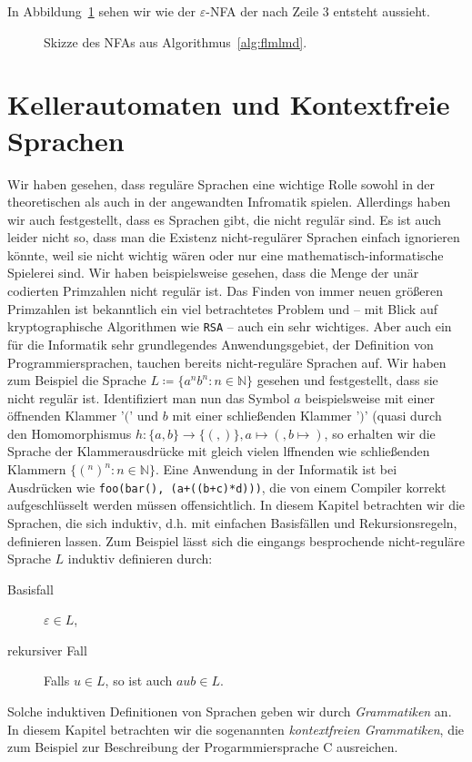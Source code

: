 \documentclass[11pt, a4paper]{article}
\theoremstyle{definition}
\theoremstyle{plain}
\numberwithin{equation}{section}
\begin{document}
In Abbildung~\ref{fig:flmlmd} sehen wir wie der $\varepsilon$-NFA der nach Zeile 3 entsteht aussieht.
\begin{figure}
	\centering
	
	\caption{Skizze des NFAs aus Algorithmus~\ref{alg:flmlmd}.}
	\label{fig:flmlmd}
\end{figure}



\newpage
\section{Kellerautomaten und Kontextfreie Sprachen}\label{sec:contextfree}
Wir haben gesehen, dass reguläre Sprachen eine wichtige Rolle sowohl in der theoretischen als auch in der angewandten Infromatik spielen. Allerdings haben wir auch festgestellt, dass es Sprachen gibt, die nicht regulär sind. Es ist auch leider nicht so, dass man die Existenz nicht-regulärer Sprachen einfach ignorieren könnte, weil sie nicht wichtig wären oder nur eine mathematisch-informatische Spielerei sind. Wir haben beispielsweise gesehen, dass die Menge der unär codierten Primzahlen nicht regulär ist. Das Finden von immer neuen größeren Primzahlen ist bekanntlich ein viel betrachtetes Problem und -- mit Blick auf kryptographische Algorithmen wie \texttt{RSA} -- auch ein sehr wichtiges. Aber auch ein für die Informatik sehr grundlegendes Anwendungsgebiet, der Definition von Programmiersprachen, tauchen bereits nicht-reguläre Sprachen auf. Wir haben zum Beispiel die Sprache $L \coloneqq \{a^n b^n : n \in \mathbb{N}\}$ gesehen und festgestellt, dass sie nicht regulär ist. Identifiziert man nun das Symbol $a$ beispielsweise mit einer öffnenden Klammer '$($' und $b$ mit einer schließenden Klammer '$)$' (quasi durch den Homomorphismus $h\colon \{a, b\} \to \{(, )\}, a \mapsto (, b \mapsto )$, so erhalten wir die Sprache der Klammerausdrücke mit gleich vielen lffnenden wie schließenden Klammern $\{(^n)^n : n \in \mathbb{N}\}$. Eine Anwendung in der Informatik ist bei Ausdrücken wie \texttt{foo(bar(), (a+((b+c)*d)))}, die von einem Compiler korrekt aufgeschlüsselt werden müssen offensichtlich. In diesem Kapitel betrachten wir die Sprachen, die sich induktiv, d.h. mit einfachen Basisfällen und Rekursionsregeln, definieren lassen. Zum Beispiel lässt sich die eingangs besprochende nicht-reguläre Sprache $L$ induktiv definieren durch:
\begin{description}
	\item[Basisfall] $\varepsilon \in L$,
	\item[rekursiver Fall] Falls $u \in L$, so ist auch $aub \in L$.
\end{description}
Solche induktiven Definitionen von Sprachen geben wir durch \textit{Grammatiken} an. In diesem Kapitel betrachten wir die sogenannten \textit{kontextfreien Grammatiken}, die zum Beispiel zur Beschreibung der Progarmmiersprache C ausreichen.
\end{document}
